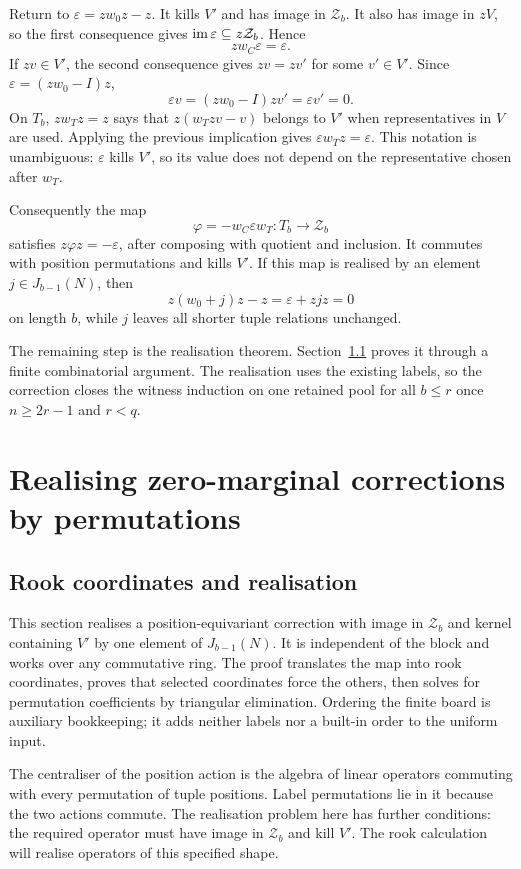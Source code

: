 \documentclass[11pt,a4paper]{article}
\theoremstyle{definition}\newtheorem{definition}[theorem]{Definition}
\theoremstyle{remark}\newtheorem{remark}[theorem]{Remark}
\begin{document}
Return to $\varepsilon=zw_0z-z$. It kills $V'$ and has image in $\mathcal Z_b$. It also has image in $zV$, so the first consequence gives $\operatorname{im}\varepsilon\subseteq z\mathcal Z_b$. Hence
\[zw_C\varepsilon=\varepsilon.
\]
If $zv\in V'$, the second consequence gives $zv=zv'$ for some $v'\in V'$. Since $\varepsilon=(zw_0-I)z$,
\[\varepsilon v=(zw_0-I)zv' =\varepsilon v'=0.
\]
On $T_b$, $zw_Tz=z$ says that $z(w_Tzv-v)$ belongs to $V'$ when representatives in $V$ are used. Applying the previous implication gives $\varepsilon w_Tz=\varepsilon$. This notation is unambiguous: $\varepsilon$ kills $V'$, so its value does not depend on the representative chosen after $w_T$.

Consequently the map
\[\varphi=-w_C\varepsilon w_T:T_b\longrightarrow \mathcal Z_b
\]
satisfies $z\varphi z=-\varepsilon$, after composing with quotient and inclusion. It commutes with position permutations and kills $V'$. If this map is realised by an element $j\in J_{b-1}(N)$, then
\[z(w_0+j)z-z=\varepsilon+zjz=0
\]
on length $b$, while $j$ leaves all shorter tuple relations unchanged.

The remaining step is the realisation theorem. Section~\ref{sec:rooks} proves it through a finite combinatorial argument. The realisation uses the existing labels, so the correction closes the witness induction on one retained pool for all $b\le r$ once $n\ge2r-1$ and $r<q$.

\section{Realising zero-marginal corrections by permutations}\label{sec:rook-realization}
\subsection{Rook coordinates and realisation}\label{sec:rooks}
This section realises a position-equivariant correction with image in $\mathcal Z_b$ and kernel containing $V'$ by one element of $J_{b-1}(N)$. It is independent of the block and works over any commutative ring. The proof translates the map into rook coordinates, proves that selected coordinates force the others, then solves for permutation coefficients by triangular elimination. Ordering the finite board is auxiliary bookkeeping; it adds neither labels nor a built-in order to the uniform input.

The centraliser of the position action is the algebra of linear
operators commuting with every permutation of tuple positions.
Label permutations lie in it because the two actions commute.
The realisation problem here has further conditions: the required
operator must have image in $\mathcal Z_b$ and kill $V'$.
The rook calculation will realise operators of this specified shape.
\end{document}
